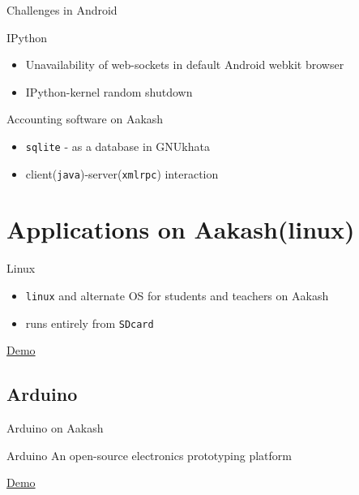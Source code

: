 \documentclass{beamer}
\begin{document}
  \begin{frame}{Challenges in Android}
    \begin{block}{IPython}
      \begin{itemize}
        \item Unavailability of web-sockets in default Android webkit
          browser
        \item IPython-kernel random shutdown
      \end{itemize}
    \end{block}
    \begin{block}{Accounting software on Aakash}
      \begin{itemize}
        \item {\tt sqlite} - as a database in GNUkhata
        \item client({\tt java})-server({\tt xmlrpc}) interaction
      \end{itemize}
    \end{block}
  \end{frame}

\section{Applications on Aakash(linux)}
\begin{frame}{Linux}
  \begin{block}{}
    \begin{itemize}
    \item {\tt linux} and alternate OS for students and teachers on
      Aakash
    \item runs entirely from {\tt SDcard}
      \pause
    \end{itemize}
  \end{block}
  \begin{block}{}
    \centerline{\href{file:///home/sachin/Videos/fossin/final.AVI}{Demo}}
  \end{block}
\end{frame}

\subsection{Arduino}
\begin{frame}{Arduino on Aakash}
  \begin{block}{Arduino}
    An open-source electronics prototyping platform
  \end{block}
  \begin{block}{}
    \centerline{\href{file:///home/sachin/Videos/fossin/final.AVI}{Demo}}
  \end{block}
\end{frame}
\end{document}
